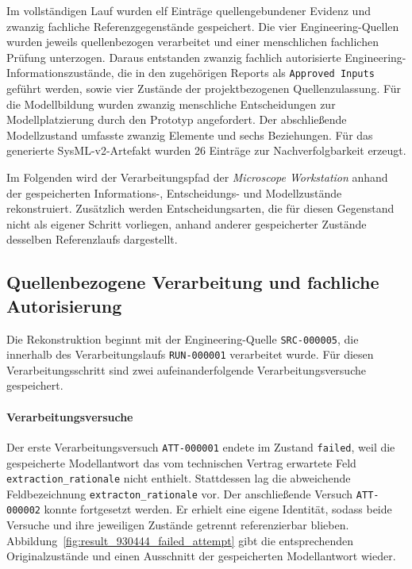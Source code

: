 Im vollständigen Lauf wurden elf Einträge quellengebundener Evidenz und
zwanzig fachliche Referenzgegenstände gespeichert. Die vier
Engineering-Quellen wurden jeweils quellenbezogen verarbeitet und einer
menschlichen fachlichen Prüfung unterzogen. Daraus entstanden zwanzig
fachlich autorisierte Engineering-Informationszustände, die in den
zugehörigen Reports als \texttt{Approved Inputs} geführt werden, sowie vier
Zustände der projektbezogenen Quellenzulassung. Für die Modellbildung wurden
zwanzig menschliche Entscheidungen zur Modellplatzierung durch den Prototyp
angefordert. Der abschließende Modellzustand umfasste zwanzig Elemente und
sechs Beziehungen. Für das generierte SysML-v2-Artefakt wurden 26 Einträge
zur Nachverfolgbarkeit erzeugt.

Im Folgenden wird der Verarbeitungspfad der
\emph{Microscope Workstation} anhand der gespeicherten Informations-,
Entscheidungs- und Modellzustände rekonstruiert. Zusätzlich werden
Entscheidungsarten, die für diesen Gegenstand nicht als eigener Schritt
vorliegen, anhand anderer gespeicherter Zustände desselben Referenzlaufs
dargestellt.

\subsection{Quellenbezogene Verarbeitung und fachliche Autorisierung}
\label{sec:results_traceability_engineering}

Die Rekonstruktion beginnt mit der Engineering-Quelle
\texttt{SRC-000005}, die innerhalb des Verarbeitungslaufs
\texttt{RUN-000001} verarbeitet wurde. Für diesen Verarbeitungsschritt sind
zwei aufeinanderfolgende Verarbeitungsversuche gespeichert.

\paragraph{Verarbeitungsversuche}

Der erste Verarbeitungsversuch \texttt{ATT-000001} endete im Zustand
\texttt{failed}, weil die gespeicherte Modellantwort das vom technischen
Vertrag erwartete Feld \texttt{extraction\_rationale} nicht enthielt.
Stattdessen lag die abweichende Feldbezeichnung
\texttt{extracton\_rationale} vor. Der anschließende Versuch
\texttt{ATT-000002} konnte fortgesetzt werden. Er erhielt eine eigene
Identität, sodass beide Versuche und ihre jeweiligen Zustände getrennt
referenzierbar blieben.
Abbildung~\ref{fig:result_930444_failed_attempt} gibt die entsprechenden
Originalzustände und einen Ausschnitt der gespeicherten Modellantwort
wieder.

